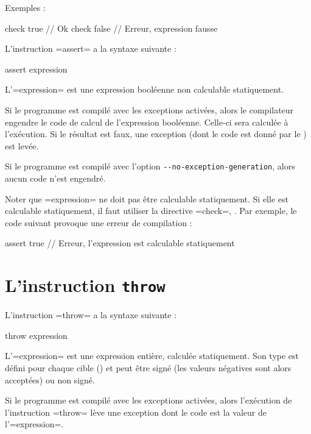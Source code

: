 Exemples :
\begin{PLM}
check true  // Ok
check false // Erreur, expression fausse
\end{PLM}




L'instruction \plm=assert= a la syntaxe suivante :
\begin{PLM}
assert expression
\end{PLM}

L'\plm=expression= est une expression booléenne non calculable statiquement.

Si le programme est compilé avec les exceptions activées, alors le compilateur engendre le code de calcul de l'expression booléenne. Celle-ci sera calculée à l'exécution. Si le résultat est faux, une exception (dont le code est donné par le ) est levée.

Si le programme est compilé avec l'option \texttt{-{}-no-exception-generation}, alors aucun code n'est engendré.

Noter que \plm=expression= ne doit pas être calculable statiquement. Si elle est calculable statiquement, il faut utiliser la directive \plm=check=, . Par exemple, le code suivant provoque une erreur de compilation :
\begin{PLM}
assert true // Erreur, l'expression est calculable statiquement
\end{PLM}



\section{L'instruction \texttt{throw}}

L'instruction \plm=throw= a la syntaxe suivante :
\begin{PLM}
throw expression
\end{PLM}

L'\plm=expression= est une expression entière, calculée statiquement. Son type est défini pour chaque cible () et peut être signé (les valeurs négatives sont alors acceptées) ou non signé.

Si le programme est compilé avec les exceptions activées, alors l'exécution de l'instruction \plm=throw= lève une exception dont le code est la valeur de l'\plm=expression=.

